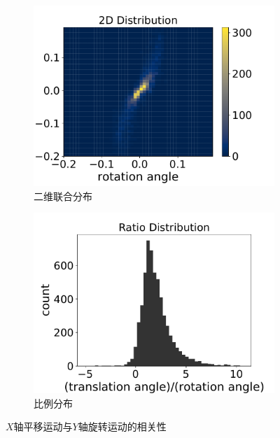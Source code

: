 \begin{figure}[ht]
    \centering
    \begin{subfigure}[b]{0.48\textwidth}
        \centering
        \includegraphics[width=\textwidth]{datavo/r_t_2d_hist.pdf}
        \caption{二维联合分布}
        \label{fig:rt_2d} 
    \end{subfigure}
    \begin{subfigure}[b]{0.48\textwidth}
        \centering
        \includegraphics[width=\textwidth]{datavo/r_t_1d_hist.pdf}
        \caption{比例分布}
        \label{fig:rt_1d}
    \end{subfigure}
    \caption{$X$轴平移运动与$Y$轴旋转运动的相关性}
    \label{fig:rotation_corr_analysis}
\end{figure}

